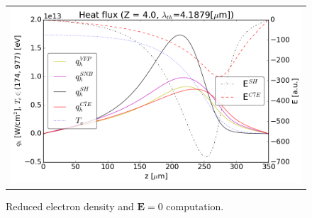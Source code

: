 \documentclass[preprint,12pt]{elsarticle}
\newcommand{\vect}[1]{\boldsymbol{#1}}
\newcommand{\E}{\vect{E}}
\begin{document}
\begin{figure}[tbh]
  \begin{center}
    \begin{tabular}{c}
      \includegraphics[width=1.0\textwidth]{../VFPdata/C7_heatflux_Emimic_12ps.png}
    \end{tabular}
  \caption{Reduced electron density and $\E=0$ computation.
  }
  \end{center}
  \label{fig:AWBScorrection_f1}
\end{figure}
\end{document}
